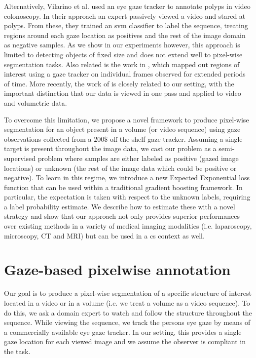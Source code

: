 Alternatively, Vilarino et al. \cite{vilarino07} used an eye gaze tracker to annotate polyps in video colonoscopy.
In their approach an expert passively viewed a video and stared at polyps.
From these, they trained an \gls{svm} classifier to label the sequence, treating regions around each gaze location as positives and the rest of the image domain as negative samples.
As we show in our experiments however, this approach is limited to detecting objects of fixed size and does not extend well to pixel-wise segmentation tasks.
Also related is the work in \cite{sadegh09}, which mapped out regions of interest using a gaze tracker on individual frames observed for extended periods of time.
More recently, the work of \cite{khosravan16} is closely related to our setting, with the important distinction that our data is viewed in one pass and applied to video and volumetric data.

To overcome this limitation, we propose a novel framework to produce pixel-wise segmentation for an object present in a volume (or video sequence) using gaze observations collected from a $200\$$ off-the-shelf gaze tracker.
Assuming a single target is present throughout the image data, we cast our problem as a semi-supervised problem where samples are either labeled as positive (gazed image locations) or unknown (the rest of the image data which could be positive or negative).
To learn in this regime, we introduce a new Expected Exponential loss
function that can be used within a traditional gradient boosting framework.
In particular, the expectation is taken with respect to the unknown labels, requiring a label probability estimate.
We describe how to estimate these with a novel strategy and show that our approach not only provides superior performances over existing methods in a variety of medical imaging modalities (i.e. laparoscopy, microscopy, CT and MRI) but can be used in a \gls{cs} context as well.

\section{Gaze-based pixelwise annotation}
Our goal is to produce a pixel-wise segmentation of a specific structure of interest located in a video or in a volume (i.e. we treat a volume as a video sequence).
To do this, we ask a domain expert to watch and follow the structure throughout the sequence.
While viewing the sequence, we track the persons eye gaze by means of a commercially available eye gaze tracker.
In our setting, this provides a single gaze location for each viewed image and we assume the observer is compliant in the task.

